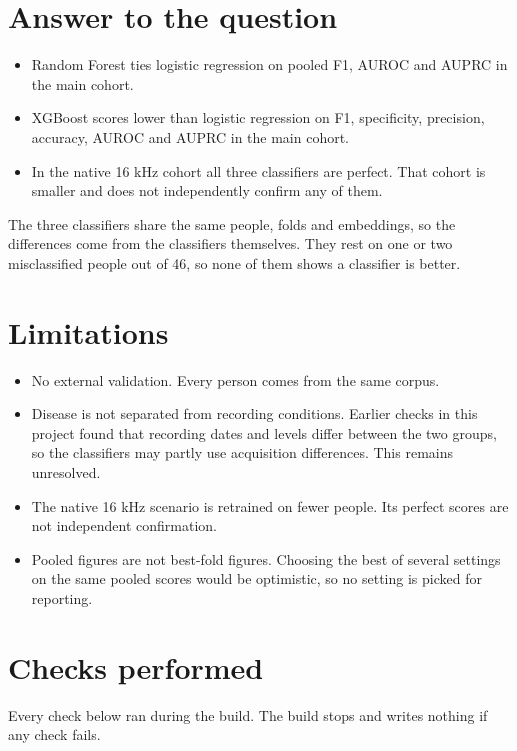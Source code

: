 \documentclass[11pt,a4paper]{article}
\begin{document}
\section{Answer to the question}\label{sec:answer}
\begin{itemize}\item Random Forest ties logistic regression on pooled F1, AUROC and AUPRC in the main cohort.
\item XGBoost scores lower than logistic regression on F1, specificity, precision, accuracy, AUROC and AUPRC in the main cohort.
\item In the native 16 kHz cohort all three classifiers are perfect. That cohort is smaller and does not independently confirm any of them.
\end{itemize}
The three classifiers share the same people, folds and embeddings, so the differences come from the classifiers themselves. They rest on one or two misclassified people out of 46, so none of them shows a classifier is better.

\section{Limitations}\label{sec:limitations}
\begin{itemize}\item No external validation. Every person comes from the same corpus.
\item Disease is not separated from recording conditions. Earlier checks in this project found that recording dates and levels differ between the two groups, so the classifiers may partly use acquisition differences. This remains unresolved.
\item The native 16 kHz scenario is retrained on fewer people. Its perfect scores are not independent confirmation.
\item Pooled figures are not best-fold figures. Choosing the best of several settings on the same pooled scores would be optimistic, so no setting is picked for reporting.
\end{itemize}
\section{Checks performed}\label{sec:checks}
Every check below ran during the build. The build stops and writes nothing if any check fails.
\end{document}

